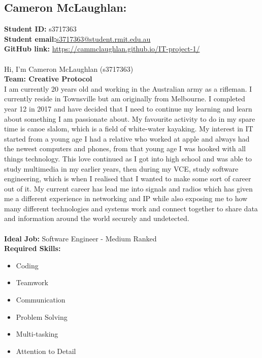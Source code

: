 \documentclass[11pt, oneside, a4paper, titlepage]{article}
\begin{document}
\subsection{Cameron McLaughlan:}
\textbf{Student ID:} \hfill s3717363\\
\textbf{Student email:}\hfill \href{mailto:s3717363@student.rmit.edu.au}{s3717363@student.rmit.edu.au}\\
\textbf{GitHub link:} \hfill \href{https://cammclaughlan.github.io/IT-project-1/}{https://cammclaughlan.github.io/IT-project-1/} \\
\\
Hi, I'm Cameron McLaughlan (s3717363)
\\
\textbf{Team: Creative Protocol}
\\
I am currently 20 years old and working in the Australian army as a rifleman. I currently reside in Townsville but am originally from Melbourne. I completed year 12 in 2017 and have decided that I need to continue my learning and learn about something I am passionate about. My favourite activity to do in my spare time is canoe slalom, which is a field of white-water kayaking. My interest in IT started from a young age I had a relative who worked at apple and always had the newest computers and phones, from that young age I was hooked with all things technology. This love continued as I got into high school and was able to study multimedia in my earlier years, then during my VCE, study software engineering, which is when I realised that I wanted to make some sort of career out of it.  My current career has lead me into signals and radios which has given me a different experience in networking and IP while also exposing me to how many different technologies and systems work and connect together to share data and information around the world securely and undetected. 
\\
\\
\textbf{Ideal Job:} \hfill Software Engineer - Medium Ranked\\
\textbf{Required Skills: }
\begin{itemize}
	\setlength\itemsep{0em}
	\item Coding
	\item Teamwork
	\item Communication
	\item Problem Solving
	\item Multi-tasking
	\item Attention to Detail
\end{itemize}
\newpage
\end{document}
